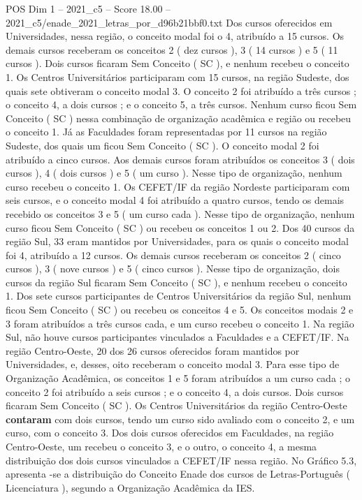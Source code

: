 \begin{textsample}{POS Dim 1 – 2021\_c5 – Score 18.00 – 2021\_c5/enade\_2021\_letras\_por\_d96b21bbf0.txt}
Dos cursos oferecidos em Universidades, nessa região, o conceito modal foi o 4, atribuído a 15 cursos.
Os demais cursos receberam os conceitos 2 ( dez cursos ), 3 ( 14 cursos ) e 5 ( 11 cursos ).
Dois cursos ficaram Sem Conceito ( SC ), e nenhum recebeu o conceito 1.
Os Centros Universitários participaram com 15 cursos, na região Sudeste, dos quais sete obtiveram o conceito modal 3.
O conceito 2 foi atribuído a três cursos ; o conceito 4, a dois cursos ; e o conceito 5, a três cursos.
Nenhum curso ficou Sem Conceito ( SC ) nessa combinação de organização acadêmica e região ou recebeu o conceito 1.
Já as Faculdades foram representadas por 11 cursos na região Sudeste, dos quais um ficou Sem Conceito ( SC ).
O conceito modal 2 foi atribuído a cinco cursos.
Aos demais cursos foram atribuídos os conceitos 3 ( dois cursos ), 4 ( dois cursos ) e 5 ( um curso ).
Nesse tipo de organização, nenhum curso recebeu o conceito 1.
Os CEFET/IF da região Nordeste participaram com seis cursos, e o conceito modal 4 foi atribuído a quatro cursos, tendo os demais recebido os conceitos 3 e 5 ( um curso cada ).
Nesse tipo de organização, nenhum curso ficou Sem Conceito ( SC ) ou recebeu os conceitos 1 ou 2.
Dos 40 cursos da região Sul, 33 eram mantidos por Universidades, para os quais o conceito modal foi 4, atribuído a 12 cursos.
Os demais cursos receberam os conceitos 2 ( cinco cursos ), 3 ( nove cursos ) e 5 ( cinco cursos ).
Nesse tipo de organização, dois cursos da região Sul ficaram Sem Conceito ( SC ), e nenhum recebeu o conceito 1.
Dos sete cursos participantes de Centros Universitários da região Sul, nenhum ficou Sem Conceito ( SC ) ou recebeu os conceitos 4 e 5.
Os conceitos modais 2 e 3 foram atribuídos a três cursos cada, e um curso recebeu o conceito 1.
Na região Sul, não houve cursos participantes vinculados a Faculdades e a CEFET/IF.
Na região Centro-Oeste, 20 dos 26 cursos oferecidos foram mantidos por Universidades, e, desses, oito receberam o conceito modal 3.
Para esse tipo de Organização Acadêmica, os conceitos 1 e 5 foram atribuídos a um curso cada ; o conceito 2 foi atribuído a seis cursos ; e o conceito 4, a dois cursos.
Dois cursos ficaram Sem Conceito ( SC ).
Os Centros Universitários da região Centro-Oeste \textbf{contaram} com dois cursos, tendo um curso sido avaliado com o conceito 2, e um curso, com o conceito 3.
Dos dois cursos oferecidos em Faculdades, na região Centro-Oeste, um recebeu o conceito 3, e o outro, o conceito 4, a mesma distribuição dos dois cursos vinculados a CEFET/IF nessa região.
No Gráfico 5.3, apresenta -se a distribuição do Conceito Enade dos cursos de Letras-Português ( Licenciatura ), segundo a Organização Acadêmica da IES.

\end{textsample}
